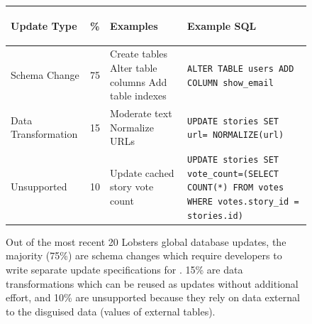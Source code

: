 \begin{figure}
    \centering
    \begin{tabular}{m{}|m{}|m{}|m{}}
        \centering\textbf{Update Type} & \centering\textbf{\%} &
        \centering\textbf{Examples} &\begin{center}\textbf{Example
        SQL}\end{center}\\
        \hline
        Schema Change & \begin{center}75\end{center} & Create tables \newline Alter table columns \newline Add table indexes & \texttt{ALTER TABLE users ADD COLUMN show\_email} \\
        \hline
        Data Transformation & \begin{center}15\end{center} & Moderate text \newline Normalize URLs & \texttt{UPDATE stories SET
        url= NORMALIZE(url)} \\
        \hline
            Unsupported & \begin{center}10\end{center} & Update cached story vote count & \texttt{UPDATE stories SET
        vote\_count=(SELECT COUNT(*) FROM votes WHERE votes.story\_id =
        stories.id)} \\
    \end{tabular}
 
    \caption[\sys supports 90\% of Lobsters' recent global database updates.]{Out of the most recent 20 Lobsters global database updates,
    the majority (75\%) are schema changes which require developers to write
    separate update specifications for \sys. 15\% are data transformations which can
    be reused as updates without additional effort, and 10\% are unsupported
    because they rely on data external to the disguised data (values of 
    external tables).}
  \label{tab:categories}
\end{figure}

